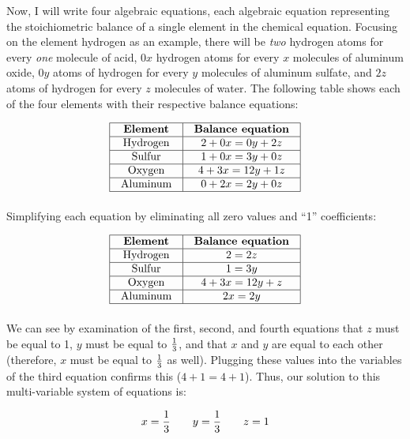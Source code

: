 Now, I will write four algebraic equations, each algebraic equation representing the stoichiometric balance of a single element in the chemical equation.  Focusing on the element hydrogen as an example, there will be \textit{two} hydrogen atoms for every \textit{one} molecule of acid, $0x$ hydrogen atoms for every $x$ molecules of aluminum oxide, $0y$ atoms of hydrogen for every $y$ molecules of aluminum sulfate, and $2z$ atoms of hydrogen for every $z$ molecules of water.  The following table shows each of the four elements with their respective balance equations:


$$\vbox{\offinterlineskip
\halign{\strut
\vrule \quad\hfil # \ \hfil & 
\vrule \quad\hfil # \ \hfil \vrule \cr
\noalign{\hrule}
%
\textbf{Element} & \textbf{Balance equation} \cr
%
\noalign{\hrule}
%
Hydrogen & $2 + 0x = 0y + 2z$ \cr
%
\noalign{\hrule}
%
Sulfur & $1 + 0x = 3y + 0z$ \cr
%
\noalign{\hrule}
%
Oxygen & $4 + 3x = 12y + 1z$ \cr
%
\noalign{\hrule}
%
Aluminum & $0 + 2x = 2y + 0z$ \cr
%
\noalign{\hrule}
} %
}$$ %

Simplifying each equation by eliminating all zero values and ``1'' coefficients:


$$\vbox{\offinterlineskip
\halign{\strut
\vrule \quad\hfil # \ \hfil & 
\vrule \quad\hfil # \ \hfil \vrule \cr
\noalign{\hrule}
%
\textbf{Element} & \textbf{Balance equation} \cr
%
\noalign{\hrule}
%
Hydrogen & $2 = 2z$ \cr
%
\noalign{\hrule}
%
Sulfur & $1 = 3y$ \cr
%
\noalign{\hrule}
%
Oxygen & $4 + 3x = 12y + z$ \cr
%
\noalign{\hrule}
%
Aluminum & $2x = 2y$ \cr
%
\noalign{\hrule}
} %
}$$ %

We can see by examination of the first, second, and fourth equations that $z$ must be equal to 1, $y$ must be equal to ${1 \over 3}$, and that $x$ and $y$ are equal to each other (therefore, $x$ must be equal to ${1 \over 3}$ as well).  Plugging these values into the variables of the third equation confirms this ($4 + 1 = 4 + 1$).  Thus, our solution to this multi-variable system of equations is:

$$x = {1 \over 3} \hskip 20pt y = {1 \over 3} \hskip 20pt z = 1$$

